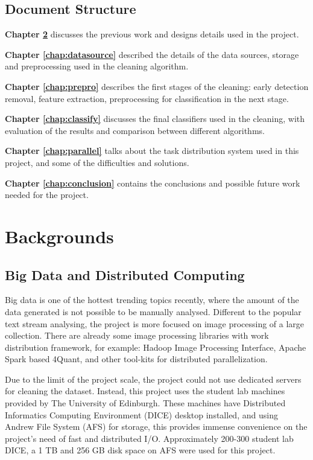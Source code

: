 \documentclass[bsc,logo,twoside,fullspacing,parskip]{infthesis}
\begin{document}
\section{Document Structure}

\textbf{Chapter \ref{chap:bg}} discusses the previous work and designs details used in the project. 

\textbf{Chapter \ref{chap:datasource}} described the details of the data sources, storage and preprocessing used in the cleaning algorithm.

\textbf{Chapter \ref{chap:prepro}} describes the first stages of the cleaning: early detection removal, feature extraction, preprocessing for classification in the next stage.

\textbf{Chapter \ref{chap:classify}} discusses the final classifiers used in the cleaning, with evaluation of the results and comparison between different algorithms. 


\textbf{Chapter \ref{chap:parallel}} talks about the task distribution system used in this project, and some of the difficulties and solutions.

\textbf{Chapter \ref{chap:conclusion}} contains the conclusions and possible future work needed for the project.
\newpage


\chapter{Backgrounds}
\label{chap:bg}

\section{Big Data and Distributed Computing}

Big data is one of the hottest trending topics recently, where the amount of the data generated is not possible to be manually analysed. 
Different to the popular text stream analysing, the project is more focused on image processing of a large collection. 
There are already some image processing libraries with work distribution framework, for example: Hadoop Image Processing Interface\cite{L3}, Apache Spark based 4Quant\cite{L4}, and other tool-kits for distributed parallelization.

Due to the limit of the project scale, the project could not use dedicated servers for cleaning the dataset.
Instead, this project uses the student lab machines provided by The University of Edinburgh.
These machines have Distributed Informatics Computing Environment (DICE) desktop installed, and using Andrew File System (AFS) for storage, this provides immense convenience on the project's need of fast and distributed I/O.   
Approximately 200-300 student lab DICE, a 1 TB and 256 GB disk space on AFS were used for this project.
\end{document}
